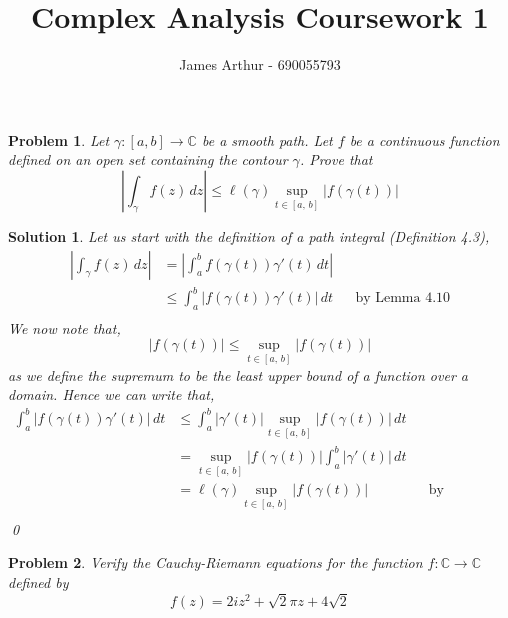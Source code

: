 \documentclass{article}
\title{Complex Analysis Coursework 1}
\author{James Arthur - 690055793}
\newcommand{\C}{\mathbb{C}}
\newcommand{\g}{\gamma}
\newtheorem{problem}{Problem}
\newtheorem{solution}{Solution}
\begin{document}
\maketitle

\begin{problem}
  Let $\g : [a, b] \to \C$ be a smooth path. Let $ f$ be a continuous function defined on an open set containing the contour $\g$. Prove that
  $$ \left | \int_\g f(z)\,dz \right | \le \ell (\g) \sup_{t\in[a,\,b]}{\left |f(\g (t)) \right |}  $$
\end{problem}

\begin{solution}
  Let us start with the definition of a path integral (Definition 4.3),
  \begin{align*}
    \left | \int_\g f(z)\,dz \right | &= \left | \int_a^b f(\g(t))\g'(t)\,dt \right |\\
    &\le \int_a^b \left |f(\g(t))\g'(t)\right|\,dt && \text{by Lemma 4.10}\\
  \end{align*}
  We now note that,
  $$ |f(\g(t))| \le \sup_{t\in[a,\,b]}{\left |f(\g (t)) \right |} $$
  as we define the supremum to be the least upper bound of a function over a domain. Hence we can write that,
  \begin{align*}
    \int_a^b \left |f(\g(t))\g'(t)\right|\,dt &\le \int_a^b \left |\g'(t)\right|\sup_{t\in[a,\,b]}{\left |f(\g (t)) \right |}\,dt\\
    &= \sup_{t\in[a,\,b]}{\left |f(\g (t)) \right |}\int_a^b \left |\g'(t)\right|\,dt\\
    &= \ell(\g)\sup_{t\in[a,\,b]}{\left |f(\g (t)) \right |} && \text{by Definition 4.7}\\
  \end{align*}\qed
\end{solution}

\newpage
\begin{problem}
  Verify the Cauchy-Riemann equations for the function $f : \C \to \C$ defined by
  $$ f(z) = 2iz^2 + \sqrt 2 \pi z+ 4\sqrt 2 $$
\end{problem}
\end{document}
